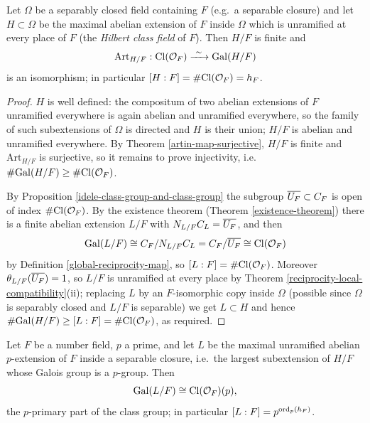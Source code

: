 \begin{thm}
\label{hilbert-class-field}
Let $\Omega$ be a separably closed field containing $F$ (e.g.~a separable
closure) and let $H\subset\Omega$ be the maximal abelian extension of $F$ inside
$\Omega$ which is unramified at every place of $F$ (the \emph{Hilbert class
field} of $F$).
Then $H/F$ is finite and
$$\mathrm{Art}_{H/F}:\Cl(\CO_F)\xrightarrow{\ \sim\ }\Gal(H/F)$$
is an isomorphism; in particular $[H:F]=\#{\mathrm{Cl}}({\mathcal {O}}_F)=h_F$.
\end{thm}

\begin{proof}
$H$ is well defined: the compositum of two abelian extensions of $F$ unramified
everywhere is again abelian and unramified everywhere, so the family of such
subextensions of $\Omega$ is directed and $H$ is their union;
$H/F$ is abelian and unramified everywhere.
By Theorem \ref{artin-map-surjective}, $H/F$ is finite and
$\mathrm{Art}_{H/F}$ is surjective, so it remains to prove injectivity, i.e.
$\#{\mathrm{Gal}}(H/F)\geq\#{\mathrm{Cl}}({\mathcal {O}}_F)$.

By Proposition \ref{idele-class-group-and-class-group} the subgroup
$\overline{U_F}\subset C_F$ is open of index $\#{\mathrm{Cl}}({\mathcal {O}}_F)$.
By the existence theorem (Theorem \ref{existence-theorem}) there is a finite
abelian extension $L/F$ with $N_{L/F}C_L=\overline{U_F}$, and then
$${\mathrm{Gal}}(L/F)\cong C_F/N_{L/F}C_L=C_F/\overline{U_F}\cong{\mathrm{Cl}}({\mathcal {O}}_F)$$
by Definition \ref{global-reciprocity-map}, so $[L:F]=\#{\mathrm{Cl}}({\mathcal {O}}_F)$.
Moreover $\theta_{L/F}(\overline{U_F})=1$, so $L/F$ is unramified at every place by
Theorem \ref{reciprocity-local-compatibility}(ii); replacing $L$ by an
$F$-isomorphic copy inside $\Omega$ (possible since $\Omega$ is separably closed
and $L/F$ is separable) we get $L\subset H$ and hence
$\#{\mathrm{Gal}}(H/F)\geq[L:F]=\#{\mathrm{Cl}}({\mathcal {O}}_F)$, as required.
\end{proof}

\begin{cor}
\label{hilbert-p-class-field}
Let $F$ be a number field, $p$ a prime, and let $L$ be the maximal unramified
abelian $p$-extension of $F$ inside a separable closure, i.e.~the largest
subextension of $H/F$ whose Galois group is a $p$-group.
Then
$${\mathrm{Gal}}(L/F)\cong{\mathrm{Cl}}({\mathcal {O}}_F)(p),$$
the $p$-primary part of the class group; in particular
$[L:F]=p^{\operatorname{ord}_p(h_F)}$.
\end{cor}

